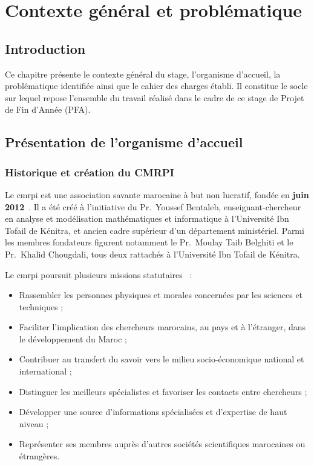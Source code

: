 \chapter{Contexte général et problématique}
\label{chap:contexte}

\section*{Introduction}

Ce chapitre présente le contexte général du stage, l'organisme d'accueil, la problématique identifiée ainsi que le cahier des charges établi. Il constitue le socle sur lequel repose l'ensemble du travail réalisé dans le cadre de ce stage de Projet de Fin d'Année (PFA).

\section{Présentation de l'organisme d'accueil}
\label{sec:organisme}

\subsection{Historique et création du CMRPI}

\hspace{1cm}Le \gls{cmrpi} est une association savante marocaine à but non lucratif, fondée en \textbf{juin 2012}~\cite{cmrpirapport2019}. Il a été créé à l'initiative du Pr.~Youssef Bentaleb, enseignant-chercheur en analyse et modélisation mathématiques et informatique à l'Université Ibn Tofail de Kénitra, et ancien cadre supérieur d'un département ministériel. Parmi les membres fondateurs figurent notamment le Pr.~Moulay Taib Belghiti et le Pr.~Khalid Chougdali, tous deux rattachés à l'Université Ibn Tofail de Kénitra.

Le \gls{cmrpi} poursuit plusieurs missions statutaires~\cite{cmrpirapport2019} :

\begin{itemize}
  \item Rassembler les personnes physiques et morales concernées par les sciences et techniques ;
  \item Faciliter l'implication des chercheurs marocains, au pays et à l'étranger, dans le développement du Maroc ;
  \item Contribuer au transfert du savoir vers le milieu socio-économique national et international ;
  \item Distinguer les meilleurs spécialistes et favoriser les contacts entre chercheurs ;
  \item Développer une source d'informations spécialisées et d'expertise de haut niveau ;
  \item Représenter ses membres auprès d'autres sociétés scientifiques marocaines ou étrangères.
\end{itemize}

